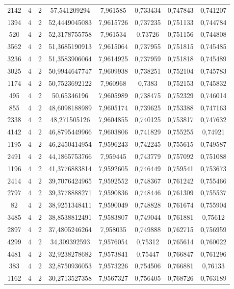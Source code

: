 \begin{longtable}{|c|c|c|c|c|c|c|c|}
2142 & 4 & 2 & 57,541209294 & 7,961585 & 0,733434 & 0,747843 & 0,741207 \\
1394 & 4 & 2 & 52,4449045083 & 7,9615726 & 0,737235 & 0,751133 & 0,744784 \\
520 & 4 & 2 & 52,3178755758 & 7,961534 & 0,73726 & 0,751156 & 0,744808 \\
3562 & 4 & 2 & 51,3685190913 & 7,9615064 & 0,737955 & 0,751815 & 0,745485 \\
3236 & 4 & 2 & 51,3583906064 & 7,9614925 & 0,737959 & 0,751818 & 0,745489 \\
3025 & 4 & 2 & 50,9944647747 & 7,9609938 & 0,738251 & 0,752104 & 0,745783 \\
1174 & 4 & 2 & 50,7523692122 & 7,960968 & 0,7383 & 0,752153 & 0,745832 \\
495 & 4 & 2 & 50,65346196 & 7,9605989 & 0,738475 & 0,752329 & 0,746014 \\
855 & 4 & 2 & 48,6098188989 & 7,9605174 & 0,739625 & 0,753388 & 0,747163 \\
2338 & 4 & 2 & 48,271505126 & 7,9604855 & 0,740125 & 0,753817 & 0,747632 \\
4142 & 4 & 2 & 46,8795449966 & 7,9603806 & 0,741829 & 0,755255 & 0,74921 \\
1195 & 4 & 2 & 46,2450414954 & 7,9596243 & 0,742245 & 0,755615 & 0,749587 \\
2491 & 4 & 2 & 44,1865753766 & 7,959445 & 0,743779 & 0,757092 & 0,751088 \\
1196 & 4 & 2 & 41,3776883814 & 7,9592605 & 0,746449 & 0,759541 & 0,753673 \\
2414 & 4 & 2 & 39,7076424965 & 7,9592552 & 0,748367 & 0,761242 & 0,755466 \\
2797 & 4 & 2 & 39,3778888271 & 7,9590836 & 0,748446 & 0,761309 & 0,755537 \\
82 & 4 & 2 & 38,9251348411 & 7,9590049 & 0,748828 & 0,761674 & 0,755904 \\
3485 & 4 & 2 & 38,8538812491 & 7,9583807 & 0,749044 & 0,761881 & 0,75612 \\
2897 & 4 & 2 & 37,4805246264 & 7,958035 & 0,749888 & 0,762715 & 0,756959 \\
4299 & 4 & 2 & 34,309392593 & 7,9576054 & 0,75312 & 0,765614 & 0,760022 \\
4481 & 4 & 2 & 32,9238278682 & 7,9573841 & 0,75447 & 0,766847 & 0,761296 \\
383 & 4 & 2 & 32,8750936053 & 7,9573226 & 0,754506 & 0,766881 & 0,76133 \\
1162 & 4 & 2 & 30,2713527358 & 7,9567327 & 0,756405 & 0,768726 & 0,763189 \\

\end{longtable}
